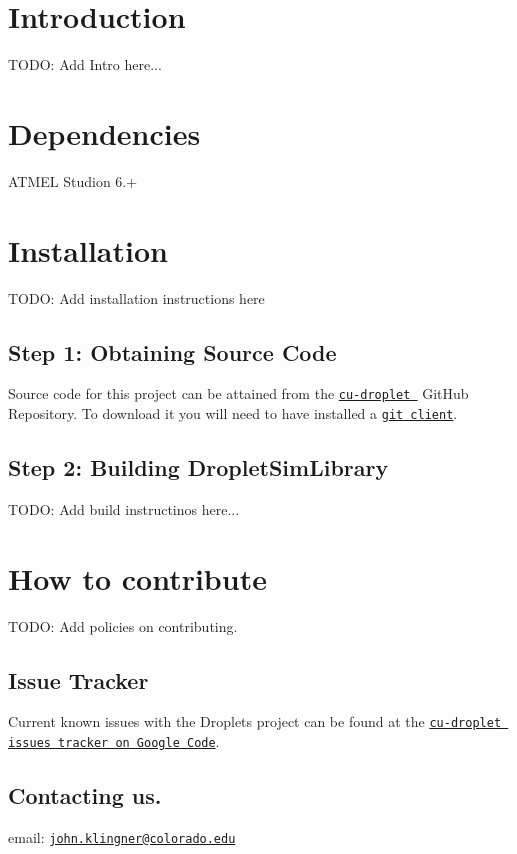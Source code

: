 \hypertarget{index_main_intro}{}\section{Introduction}\label{index_main_intro}
T\+O\+D\+O\+: Add Intro here...\hypertarget{index_dep_sec}{}\section{Dependencies}\label{index_dep_sec}

\begin{DoxyItemize}
\item A\+T\+M\+E\+L Studion 6.+
\end{DoxyItemize}\hypertarget{index_install_sec}{}\section{Installation}\label{index_install_sec}
T\+O\+D\+O\+: Add installation instructions here\hypertarget{index_step1}{}\subsection{Step 1\+: Obtaining Source Code}\label{index_step1}
Source code for this project can be attained from the \href{https://github.com/correlllab/cu-droplet}{\tt cu-\/droplet } Git\+Hub Repository. To download it you will need to have installed a \href{http://git-scm.com/downloads}{\tt git client}.\hypertarget{index_step3}{}\subsection{Step 2\+: Building Droplet\+Sim\+Library}\label{index_step3}
T\+O\+D\+O\+: Add build instructinos here...\hypertarget{index_contributing}{}\section{How to contribute}\label{index_contributing}
T\+O\+D\+O\+: Add policies on contributing.\hypertarget{index_issues}{}\subsection{Issue Tracker}\label{index_issues}
Current known issues with the Droplets project can be found at the \href{https://code.google.com/p/cu-droplet/issues/list}{\tt cu-\/droplet issues tracker on Google Code}.\hypertarget{index_contact}{}\subsection{Contacting us.}\label{index_contact}
email\+: \href{mailto:john.klingner@colorado.edu}{\tt john.\+klingner@colorado.\+edu} 